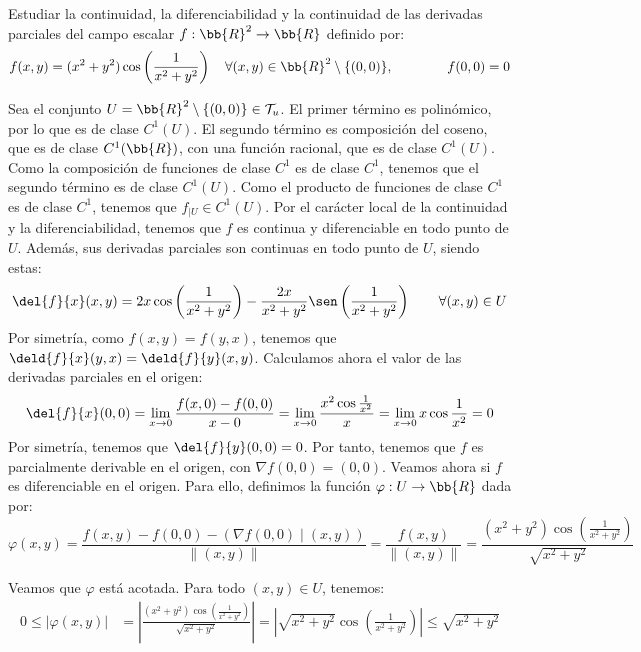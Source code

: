 \begin{ejercicio}
    Estudiar la continuidad, la diferenciabilidad y la continuidad de las derivadas parciales del campo escalar $f: \bb{R}^2 \to \bb{R}$ definido por:
    \begin{equation*}
        f(x,y)=(x^2+y^2)\cos\left(\frac{1}{x^2+y^2}\right) \quad \forall (x,y)\in \bb{R}^2\setminus \{(0,0)\},\qquad\qquad f(0,0)=0
    \end{equation*}

    Sea el conjunto $U=\bb{R}^2\setminus \{(0,0)\}\in \mathcal{T}_u$. El primer término es polinómico, por lo que es de clase $C^1(U)$.
    El segundo término es composición del coseno, que es de clase $C^1(\bb{R})$, con una función racional, que es de clase $C^1(U)$.
    Como la composición de funciones de clase $C^1$ es de clase $C^1$, tenemos que el segundo término es de clase $C^1(U)$.
    Como el producto de funciones de clase $C^1$ es de clase $C^1$, tenemos que $f_{\big| U}\in C^1(U)$.
    Por el carácter local de la continuidad y la diferenciabilidad, tenemos que $f$ es continua y diferenciable en todo punto de $U$. Además, sus derivadas parciales son continuas en todo punto de $U$, siendo estas:
    \begin{gather*}
        \del{f}{x}(x,y) = 2x\cos\left(\frac{1}{x^2+y^2}\right) - \frac{2x}{x^2+y^2}\sen\left(\frac{1}{x^2+y^2}\right) \qquad \forall (x,y)\in U \\
    \end{gather*}
    Por simetría, como $f(x,y)=f(y,x)$, tenemos que $\deld{f}{x}(y,x)=\deld{f}{y}(x,y)$. Calculamos ahora el valor de las derivadas parciales en el origen:
    \begin{equation*}
        \del{f}{x}(0,0) = \lim_{x\to 0} \frac{f(x,0) - f(0,0)}{x-0} = \lim_{x\to 0} \frac{x^2\cos\frac{1}{x^2}}{x} = \lim_{x\to 0} x\cos\frac{1}{x^2} = 0
    \end{equation*}
    Por simetría, tenemos que $\del{f}{y}(0,0)=0$. Por tanto, tenemos que $f$ es parcialmente derivable en el origen, con
    $\nabla f(0,0) = (0,0)$. Veamos ahora si $f$ es diferenciable en el origen. Para ello, definimos la función $\varphi:U\to \bb{R}$ dada por:
    \begin{equation*}
        \varphi(x,y) = \frac{f(x,y) - f(0,0) - (\nabla f(0,0)\mid (x,y))}{\|(x,y)\|}
        = \frac{f(x,y)}{\|(x,y)\|} = \frac{(x^2+y^2)\cos\left(\frac{1}{x^2+y^2}\right)}{\sqrt{x^2+y^2}}
    \end{equation*}

    Veamos que $\varphi$ está acotada. Para todo $(x,y)\in U$, tenemos:
    \begin{equation*}\begin{split}
        0\leq |\varphi(x,y)| &=
        \left|\frac{(x^2+y^2)\cos\left(\frac{1}{x^2+y^2}\right)}{\sqrt{x^2+y^2}}\right|
        = \left|\sqrt{x^2+y^2}\cos\left(\frac{1}{x^2+y^2}\right)\right| \leq \sqrt{x^2+y^2}
    \end{split}\end{equation*}


\end{ejercicio}
